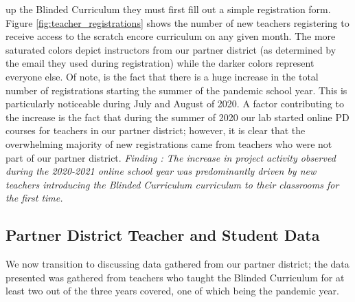 \documentclass[sigconf,manuscript,review,anonymous]{acmart} %
\newcommand{\Scratchencore}[0]{Blinded Curriculum}
\begin{document}
up the \Scratchencore{} they must first fill out a simple registration form. Figure 
\ref{fig:teacher_registrations} shows the number of new teachers registering to
receive access to the scratch encore curriculum on any given month. The more saturated
colors depict instructors from our partner district (as determined by the email they used
during registration) while the darker colors represent everyone else. 
Of note, is the fact that there is a huge increase in the total number of registrations starting
the summer of the pandemic school year. This is particularly noticeable during July and
August of 2020. A factor contributing to the increase is the fact that during the summer
of 2020 our lab started online PD courses for teachers in our partner district; however,
it is clear that the overwhelming majority of new registrations came from teachers who
were not part of our partner district. 
\textit{Finding : The increase in project activity observed
during the 2020-2021 online school year was predominantly driven by new teachers
introducing the \Scratchencore{} curriculum to their classrooms for the first time.}\\
\subsection{Partner District Teacher and Student Data}
We now transition to discussing data gathered from our partner district; the data presented
was gathered from teachers who taught the \Scratchencore{} for at least two out
of the three years covered, one of which being the pandemic year.
\end{document}
